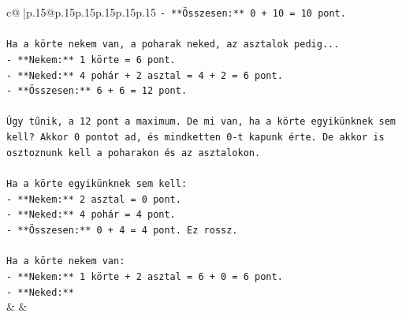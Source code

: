 \documentclass{article}
\begin{document}
{\begin{supertabular}{c@{$\;$}|p{.15\linewidth}@{}p{.15\linewidth}p{.15\linewidth}p{.15\linewidth}p{.15\linewidth}p{.15\linewidth}}
{{{\texttt{{-} **Összesen:** 0 + 10 = 10 pont.} \\
\\ 
\texttt{Ha a körte nekem van, a poharak neked, az asztalok pedig...} \\
\texttt{{-} **Nekem:** 1 körte = 6 pont.} \\
\texttt{{-} **Neked:** 4 pohár + 2 asztal = 4 + 2 = 6 pont.} \\
\texttt{{-} **Összesen:** 6 + 6 = 12 pont.} \\
\\ 
\texttt{Úgy tűnik, a 12 pont a maximum. De mi van, ha a körte egyikünknek sem kell? Akkor 0 pontot ad, és mindketten 0{-}t kapunk érte. De akkor is osztoznunk kell a poharakon és az asztalokon.} \\
\\ 
\texttt{Ha a körte egyikünknek sem kell:} \\
\texttt{{-} **Nekem:** 2 asztal = 0 pont.} \\
\texttt{{-} **Neked:** 4 pohár = 4 pont.} \\
\texttt{{-} **Összesen:** 0 + 4 = 4 pont. Ez rossz.} \\
\\ 
\texttt{Ha a körte nekem van:} \\
\texttt{{-} **Nekem:** 1 körte + 2 asztal = 6 + 0 = 6 pont.} \\
\texttt{{-} **Neked:**} \\
            }
        }
    }
    & & \\ \\


\end{supertabular}}
\end{document}
